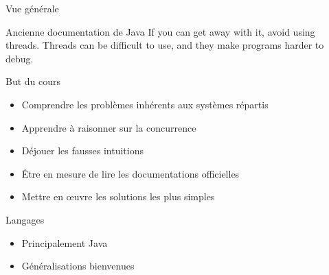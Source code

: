 
\begingroup

\begin{frame}{Vue générale}

  \begin{shadequote}{Ancienne documentation de Java}
    If you can get away with it, avoid using threads. Threads can be difficult to use, and they make programs harder to debug.
  \end{shadequote}
  
  \begin{alertblock}{But du cours}
    \begin{itemize}
    \item Comprendre les problèmes inhérents aux systèmes répartis
    \item Apprendre à raisonner sur la concurrence
    \item Déjouer les fausses intuitions
    \item Être en mesure de lire les documentations officielles
    \item Mettre en œuvre les solutions les plus simples
    \end{itemize}
  \end{alertblock}

  \begin{alertblock}{Langages}
    \begin{itemize}
    \item Principalement Java
    \item Généralisations bienvenues
    \end{itemize}
  \end{alertblock}

\end{frame}

\endgroup
\endinput
